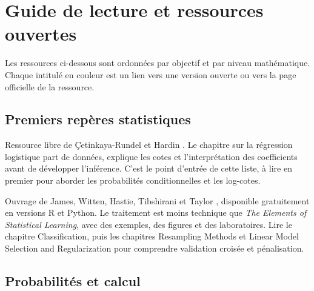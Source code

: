 \chapter{Guide de lecture et ressources ouvertes}
\label{ch:reading-guide}

Les ressources ci-dessous sont ordonnées par objectif et par niveau mathématique.
Chaque intitulé en couleur est un lien vers une version ouverte ou vers la page
officielle de la ressource.

\section{Premiers repères statistiques}

\begin{description}[style=nextline,leftmargin=0pt]
  \item[\href{https://openintrostat.github.io/ims/}{Introduction to Modern
  Statistics --- chapitre 9}] Ressource libre de Çetinkaya-Rundel et Hardin
  \cite{openintro2024}. Le chapitre sur la régression logistique part de données,
  explique les cotes et l'interprétation des coefficients avant de développer
  l'inférence. C'est le point d'entrée de cette liste, à lire en premier pour
  aborder les probabilités conditionnelles et les log-cotes.

  \item[\href{https://www.statlearning.com/}{An Introduction to Statistical
  Learning}] Ouvrage de James, Witten, Hastie, Tibshirani et Taylor
  \cite{james2023}, disponible gratuitement en versions R et Python. Le traitement
  est moins technique que \emph{The Elements of Statistical Learning}, avec des
  exemples, des figures et des laboratoires. Lire le chapitre Classification,
  puis les chapitres Resampling Methods et Linear Model Selection and
  Regularization pour comprendre validation croisée et pénalisation.
\end{description}

\section{Probabilités et calcul}

